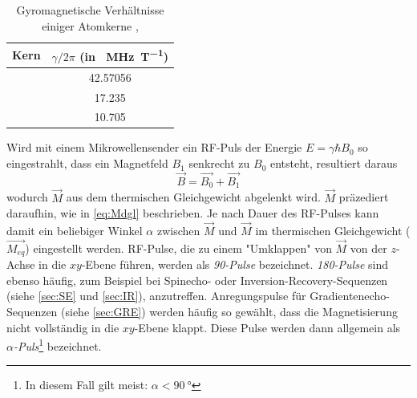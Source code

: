 \begin{table}[H]
	\centering
	\caption[Auswahl gyromagnetischer Verhältnisse]{Gyromagnetische Verhältnisse einiger Atomkerne \cite{Seidel2015},\cite{Weast1984}}
	\label{tab:gyroV}
	\begin{tabular}{lS}
		\toprule
		\textbf{Kern} & \textbf{$\gamma/2\pi$ (in \SI{}{\mega\hertz\per\tesla})} \\
		\midrule
		 & 42.57056 \\
		 & 17.235 \\
		 & 10.705 \\
		\bottomrule
	\end{tabular}
\end{table}

Wird mit einem Mikrowellensender ein RF-Puls der Energie $E=\gamma \hbar B_0$ so eingestrahlt, dass ein Magnetfeld $B_1$ senkrecht zu $B_0$ entsteht, resultiert daraus
\begin{equation}
	\vec{B}=\vec{B_0}+\vec{B_1}
\end{equation}
wodurch $\vec{M}$ aus dem thermischen Gleichgewicht abgelenkt wird. $\vec{M}$ präzediert daraufhin, wie in \autoref{eq:Mdgl} beschrieben. Je nach Dauer des RF-Pulses kann damit ein beliebiger Winkel $\alpha$ zwischen $\vec{M}$ und $\vec{M}$ im thermischen Gleichgewicht ($\vec{M_{eq}}$) eingestellt werden.
RF-Pulse, die zu einem "Umklappen" von $\vec{M}$ von der $z$-Achse in die $xy$-Ebene führen, werden als \textit{90\degree-Pulse} bezeichnet. \textit{180\degree-Pulse} sind ebenso häufig, zum Beispiel bei Spinecho- oder Inversion-Recovery-Sequenzen (siehe \autoref{sec:SE} und \autoref{sec:IR}), anzutreffen. Anregungspulse für Gradientenecho-Sequenzen (siehe \autoref{sec:GRE}) werden häufig so gewählt, dass die Magnetisierung nicht vollständig in die $xy$-Ebene klappt. Diese Pulse werden dann allgemein als \textit{$\alpha$-Puls}\footnote{In diesem Fall gilt meist: $\alpha<\SI{90}{\degree}$} bezeichnet.

